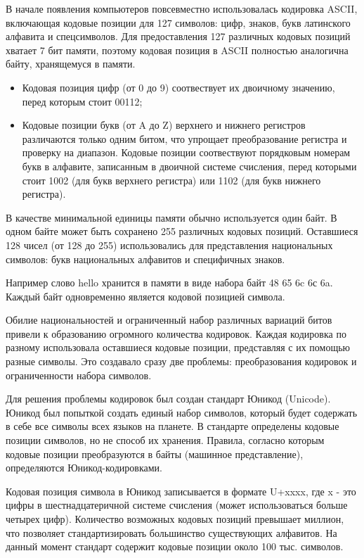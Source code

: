 В начале появления компьютеров повсевместно использовалась кодировка ASCII, включающая кодовые позиции для 127 символов: цифр, знаков, букв латинского алфавита и спецсимволов. Для предоставления 127 различных кодовых позиций хватает 7 бит памяти, поэтому кодовая позиция в ASCII полностью аналогична байту, хранящемуся в памяти.

\begin{itemize}
  \item Кодовая позиция цифр (от 0 до 9) соотвествует их двоичному значению, перед которым стоит 00112;

  \item Кодовые позиции букв (от A до Z) верхнего и нижнего регистров различаются только одним битом, что упрощает преобразование регистра и проверку на диапазон. Кодовые позиции соотвествуют порядковым номерам букв в алфавите, записанным в двоичной системе счисления, перед которыми стоит 1002 (для букв верхнего регистра) или 1102 (для букв нижнего регистра).
\end{itemize}

В качестве минимальной единицы памяти обычно используется один байт. В одном байте может быть сохранено 255 различных кодовых позиций. Оставшиеся 128 чисел (от 128 до 255) использовались для представления национальных символов: букв национальных алфавитов и специфичных знаков.

Например слово hello хранится в памяти в виде набора байт 48 65 6c 6с 6a. Каждый байт одновременно является кодовой позицией символа.

Обилие национальностей и ограниченный набор различных вариаций битов привели к образованию огромного количества кодировок. Каждая кодировка по разному использовала оставшиеся кодовые позиции, представляя с их помощью разные символы. Это создавало сразу две проблемы: преобразования кодировок и ограниченности набора символов.

Для решения проблемы кодировок был создан стандарт Юникод (Unicode). Юникод был попыткой создать единый набор символов, который будет содержать в себе все символы всех языков на планете. В стандарте определены кодовые позиции символов, но не способ их хранения. Правила, согласно которым кодовые позиции преобразуются в байты (машинное представление), определяются Юникод-кодировками.

Кодовая позиция символа в Юникод записывается в формате U+xxxx, где x - это цифры в шестнадцатеричной системе счисления (может использоваться больше четырех цифр). Количество возможных кодовых позиций превышает миллион, что позволяет стандартизировать большинство существующих алфавитов. На данный момент стандарт содержит кодовые позиции около 100 тыс. символов.

